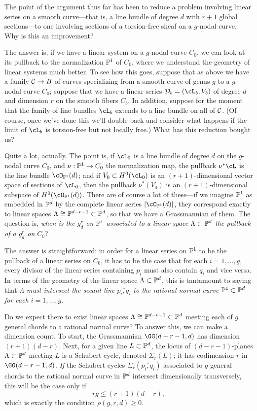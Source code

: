 The point of the argument thus far has been to reduce a problem involving linear series on a smooth curve---that is, a line bundle of degree $d$ with $r+1$ global sections---to one involving sections of a torsion-free sheaf on a $g$-nodal curve. Why is this an improvement? 

The answer is, if we have a linear system on a $g$-nodal curve $C_0$, we can look at its pullback to the normalization $\PP^1$ of $C_0$, where we understand the geometry of linear systems much better. To see how this goes, suppose that as above we have a family $\cC \to B$ of curves specializing from a smooth curve of genus $g$ to a $g$-nodal curve $C_0$; suppose that we have a linear series $\cD_b = (\cL_b, V_b)$ of degree $d$ and dimension $r$ on the smooth fibers $C_b$. In addition, suppose for the moment that the family of line bundles $\cL_b$ extends to a line bundle on all of $\cC$. (Of course, once we've done this we'll double back and consider what happens if the limit of $\cL_b$ is torsion-free but not locally free.) What has this reduction bought us?

Quite a lot, actually. The point is, if $\cL_0$ is a line bundle of degree $d$ on the $g$-nodal curve $C_0$, and $\nu : \PP^1 \to C_0$ the normalization map, the pullback $\nu^*\cL$ is the line bundle $\cO_{\PP^1}(d)$; and if $V_0 \subset H^0(\cL_0)$ is an $(r+1)$-dimensional vector space of sections of $\cL_0$, then the pullback $\nu^*(V_0)$ is  an $(r+1)$-dimensional subspace of $H^0(\cO_{\PP^1}(d))$. There are of course a lot of these---if we imagine $\PP^1$ as embedded in $\PP^d$ by the complete linear series $|\cO_{\PP^1}(d)|$, they correspond exactly to linear spaces $\Lambda \cong \PP^{d-r-1} \subset \PP^d$, so that we have a Grassmannian of them. The question is, \emph{when is the $g^r_d$ on $\PP^1$ associated to a linear space $\Lambda \subset \PP^d$ the pullback of a $g^r_d$ on $C_0$}?

The answer is straightforward: in order for a linear series on $\PP^1$ to be the pullback of a linear series on $C_0$, it has to be the case that for each $i = 1,\dots, g$, every divisor of the linear series containing $p_i$ must also contain $q_i$ and vice versa. In terms of the geometry of the linear space $\Lambda \subset \PP^d$, this is tantamount to saying that \emph{$\Lambda$ must intersect the secant line $\overline{p_i,q_i}$ to the rational normal curve $\PP^1 \subset \PP^d$ for each $i=1,\dots,g$}.

Do we expect there to exist linear spaces $\Lambda \cong \PP^{d-r-1} \subset \PP^d$ meeting each of $g$ general chords to a rational normal curve? To answer this, we can make a dimension count. To start, the Grassmannian $\GG(d-r-1,d)$ has dimension $(r+1)(d-r)$. Next, for a given line $L \subset \PP^d$, the locus of $(d-r-1)$-planes $\Lambda \subset \PP^d$ meeting $L$ is a Schubert cycle, denoted $\Sigma_r(L)$; it has codimension $r$ in $\GG(d-r-1,d)$. \emph{If}  the Schubert cycles $\Sigma_r(\overline{p_i,q_i})$ associated to $g$ general chords to the rational normal curve in $\PP^d$ intersect dimensionally transversely, this will be the case only if
$$
rg \leq (r+1)(d-r),
$$
which is exactly the condition $\rho(g,r,d) \geq 0$.

